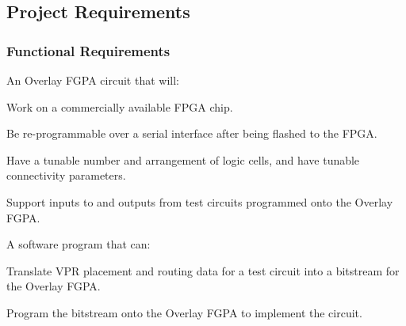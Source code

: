 \subsection{Project Requirements}

%


\subsubsection{Functional Requirements}

An Overlay FGPA circuit that will:

\begin{itemlist}
	\item Work on a commercially available FPGA chip.
	\item Be re-programmable over a serial interface after being flashed to the FPGA.
	\item Have a tunable number and arrangement of logic cells, and have tunable connectivity parameters. 
	\item Support inputs to and outputs from test circuits programmed onto the Overlay FGPA.
\end{itemlist}

A software program that can:
\begin{itemlist}
	\item Translate VPR placement and routing data for a test circuit into a bitstream for the Overlay FGPA.
	\item Program the bitstream onto the Overlay FGPA to implement the circuit.
\end{itemlist}

